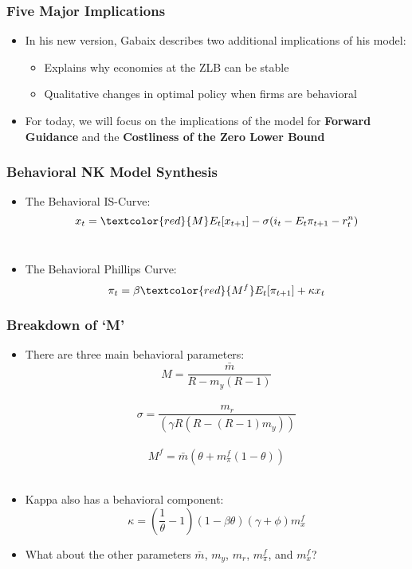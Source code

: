 \documentclass{beamer}
\begin{document}
\begin{frame}
	\frametitle{Five Major Implications}
	\begin{itemize}
		\item In his new version, Gabaix describes two additional implications of his model:
		\vspace{8pt}
		\begin{itemize}
			\item Explains why economies at the ZLB can be stable
			\item Qualitative changes in optimal policy when firms are behavioral
		\end{itemize}
		\vspace{8pt}
		\item For today, we will focus on the implications of the model for \textbf{Forward Guidance} and the \textbf{Costliness of the Zero Lower Bound}
	\end{itemize}
\end{frame}


\begin{frame}
	\frametitle{Behavioral NK Model Synthesis}
	\begin{itemize}
		\item The Behavioral IS-Curve: $$x_{t}=\textcolor{red}{M}E_{t}[x_{t+1}]-\sigma(i_{t}-E_{t}\pi_{t+1}-r_{t}^{n})$$\\
		\vspace{5pt}
		\item The Behavioral Phillips Curve: $$\pi_{t}=\beta \textcolor{red}{M^{f}}E_{t}[\pi_{t+1}]+\kappa x_{t}$$
	\end{itemize}
\end{frame}


\begin{frame}
	\frametitle{Breakdown of `M'}
	\begin{itemize}
		\item There are three main behavioral parameters:\\ 
		$$M=\frac{\bar{m}}{R-m_{y}(R-1)}$$\\
		$$\sigma=\frac{m_{r}}{(\gamma R(R-(R-1)m_{y}))}$$\\
		$$M^{f}=\bar{m}(\theta+m^{f}_{\pi}(1-\theta))$$\\
		\vspace{5pt}
		\item Kappa also has a behavioral component:\\ $$\kappa=(\frac{1}{\theta}-1)(1-\beta\theta)(\gamma+\phi)m^{f}_{x}$$
		\item What about the other parameters $\bar{m}$, $m_{y}$, $m_{r}$, $m^{f}_{\pi}$, and $m^{f}_{x}$?\\ 	
	\end{itemize}
\end{frame}
\end{document}
